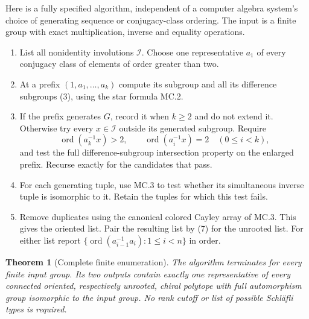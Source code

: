 \documentclass[11pt]{article}
\newtheorem{theorem}{Theorem}
\theoremstyle{remark}\newtheorem{remark}[theorem]{Remark}
\newcommand{\ord}{\operatorname{ord}}
\begin{document}
Here is a fully specified algorithm, independent of a computer algebra system's choice of generating sequence or conjugacy-class ordering. The input is a finite group with exact multiplication, inverse and equality operations.
\begin{enumerate}
\item List all nonidentity involutions $\mathcal I$. Choose one representative $a_1$ of every conjugacy class of elements of order greater than two.
\item At a prefix $(1,a_1,\ldots,a_k)$ compute its subgroup and all its difference subgroups (3), using the star formula MC.2.
\item If the prefix generates $G$, record it when $k\geq2$ and do not extend it. Otherwise try every $x\in\mathcal I$ outside its generated subgroup. Require
\[
 \ord(a_k^{-1}x)>2,\qquad
 \ord(a_i^{-1}x)=2\quad(0\leq i<k),
 \tag{8}
\]
and test the full difference-subgroup intersection property on the enlarged prefix. Recurse exactly for the candidates that pass.
\item For each generating tuple, use MC.3 to test whether its simultaneous inverse tuple is isomorphic to it. Retain the tuples for which this test fails.
\item Remove duplicates using the canonical colored Cayley array of MC.3. This gives the oriented list. Pair the resulting list by (7) for the unrooted list. For either list report
$\{\ord(a_{i-1}^{-1}a_i):1\leq i<n\}$ in order.
\end{enumerate}

\begin{theorem}[Complete finite enumeration]
The algorithm terminates for every finite input group. Its two outputs contain exactly one representative of every connected oriented, respectively unrooted, chiral polytope with full automorphism group isomorphic to the input group. No rank cutoff or list of possible Schl\"afli types is required.
\end{theorem}
\end{document}
